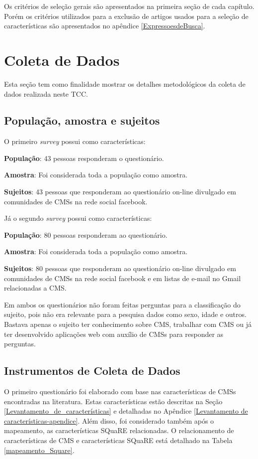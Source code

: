 Os critérios de seleção gerais são apresentados na primeira seção  de cada capítulo. Porém os critérios utilizados para a exclusão de artigos usados para a seleção de características são apresentados no apêndice \ref{ExpressoesdeBusca}.

 

\section{Coleta de Dados}
\label{Coleta de Dados}
Esta seção tem como finalidade mostrar os detalhes metodológicos da coleta de dados realizada neste TCC.

\subsection{População, amostra e sujeitos}
O primeiro \textit{survey} possui como características:

\textbf{População}: 43 pessoas responderam o questionário.
  
\textbf{Amostra}: Foi considerada toda a população como amostra.

\textbf{Sujeitos}: 43 pessoas que responderam ao questionário on-line divulgado em comunidades de CMSs na rede social facebook.

Já o segundo \textit{survey} possui como características:

\textbf{População}: 80 pessoas responderam ao questionário. 
  
\textbf{Amostra}: Foi considerada toda a população como amostra.

\textbf{Sujeitos}: 80 pessoas que responderam ao questionário on-line divulgado em comunidades de CMSs na rede social facebook e em listas de e-mail no Gmail relacionadas a CMS.

Em ambos os questionários não foram feitas perguntas para a classificação do sujeito, pois não era relevante para a pesquisa dados como sexo, idade e outros. Bastava apenas o sujeito ter conhecimento sobre CMS, trabalhar com CMS ou já ter desenvolvido aplicações web com auxílio de CMSs para responder as perguntas.

\subsection{Instrumentos de Coleta de Dados}
\label{Instrumentos_de_coleta}

O primeiro questionário foi elaborado com base nas características de CMSs encontradas na literatura. Estas características estão descritas na Seção \ref{Levantamento_de_características} e detalhadas no Apêndice \ref{Levantamento de características-apendice}. Além disso, foi considerado também após o mapeamento, as características SQuaRE relacionadas. O relacionamento de características de CMS e características SQuaRE está detalhado na Tabela \ref{mapeamento_Square}.

